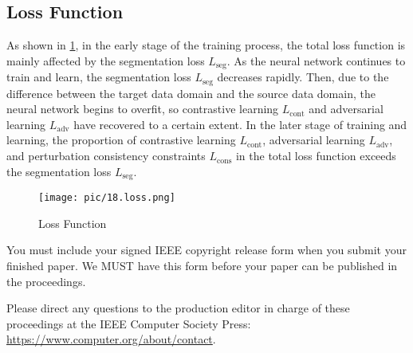 \subsection{Loss Function}

As shown in \cref{fig:loss}, in the early stage of the training process, the total loss function is mainly affected by the segmentation loss $L_{\text{seg}}$. As the neural network continues to train and learn, the segmentation loss $L_{\text{seg}}$ decreases rapidly. Then, due to the difference between the target data domain and the source data domain, the neural network begins to overfit, so contrastive learning $L_{\text{cont}}$ and adversarial learning $L_{\text{adv}}$ have recovered to a certain extent. In the later stage of training and learning, the proportion of contrastive learning $L_{\text{cont}}$, adversarial learning $L_{\text{adv}}$, and perturbation consistency constraints $L_{\text{cons}}$ in the total loss function exceeds the segmentation loss $L_{\text{seg}}$.

\begin{figure}[htbp]
    \centering
    \texttt{[image: pic/18.loss.png]}
    \caption{Loss Function}
    \label{fig:loss}
\end{figure}





You must include your signed IEEE copyright release form when you submit your finished paper.
We MUST have this form before your paper can be published in the proceedings.

Please direct any questions to the production editor in charge of these proceedings at the IEEE Computer Society Press:
\url{https://www.computer.org/about/contact}.